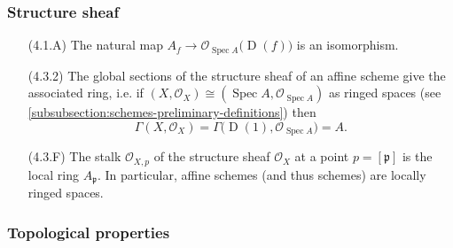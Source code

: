 \documentclass[10pt]{article}
\DeclareMathOperator{\Spec}{Spec}
\DeclareMathOperator{\D}{D}
\renewcommand{\O}{\mathcal{O}}
\newcommand{\prid}{\mathfrak{p}}
\begin{document}
            \subsubsection{Structure sheaf}
            
                \begin{itemize}
                    \item[(4.1.A)] The natural map $A_f\to\O_{\Spec A}\big(\D(f)\big)$ is an isomorphism.
                    \item[(4.3.2)] The global sections of the structure sheaf of an affine scheme give the associated ring, i.e. if $(X,\O_X)\cong(\Spec A,\O_{\Spec A})$ as ringed spaces (see \cref{subsubsection:schemes-preliminary-definitions}) then \[\Gamma(X,\O_X) = \Gamma\big(\D(1),\O_{\Spec A}\big) = A.\]
                    \item[(4.3.F)] The stalk $\O_{X,p}$ of the structure sheaf $\O_X$ at a point $p=[\prid]$ is the local ring $A_\prid$. In particular, affine schemes (and thus schemes) are locally ringed spaces.
                \end{itemize}
                
            \subsubsection{Topological properties}
            
\end{document}
